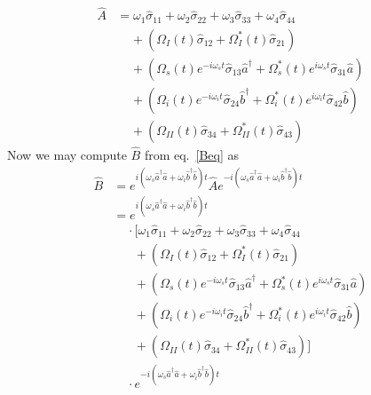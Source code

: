 \documentclass[aps,pra,showpacs,amsmath,amssymb,nofootinbib,longbibliography,superscriptaddress
]{revtex4-1}
\theoremstyle{definition}
\theoremstyle{remark}
\newcommand{\0}{\hat{0}}
\begin{document}
\begin{align}
    \hat{A}
    &=
    \omega_1 \hat{\sigma}_{11} + \omega_2 \hat{\sigma}_{22} + \omega_3 \hat{\sigma}_{33} + \omega_4 \hat{\sigma}_{44} \nonumber \\
    &\;\;\;\;+
    \left(
        \Omega_{I}(t) \hat{\sigma}_{12} +
        \Omega_{I}^*(t) \hat{\sigma}_{21}
    \right)\nonumber \\
    &\;\;\;\;+
    \left(
        \Omega_{s}(t) e^{-i \omega_s t} \hat{\sigma}_{13} \hat{a}^{\dagger} +
        \Omega_{s}^*(t) e^{i \omega_s t} \hat{\sigma}_{31} \hat{a}
    \right)\nonumber \\
    &\;\;\;\;+
    \left(
        \Omega_{i}(t) e^{-i\omega_i t} \hat{\sigma}_{24} \hat{b}^{\dagger} +
        \Omega_{i}^*(t) e^{i\omega_i t} \hat{\sigma}_{42} \hat{b}
    \right)\nonumber \\
    &\;\;\;\;+
    \left(
        \Omega_{II}(t) \hat{\sigma}_{34} +
        \Omega_{II}^*(t) \hat{\sigma}_{43}
    \right)
\end{align}
Now we may compute $\hat{B}$ from eq.~\eqref{Beq} as
\begin{align}
    \hat{B}
    &=
    e^{i(\omega_s \hat{a}^{\dagger} \hat{a} + \omega_i \hat{b}^{\dagger} \hat{b})t}
    \hat{A}
    e^{-i(\omega_s \hat{a}^{\dagger} \hat{a} + \omega_i \hat{b}^{\dagger} \hat{b})t} \nonumber \\
    &=
    e^{i(\omega_s \hat{a}^{\dagger} \hat{a} + \omega_i \hat{b}^{\dagger} \hat{b})t} \nonumber\\
    &\;\;\;\;
    \cdot \biggl[
        \omega_1 \hat{\sigma}_{11} +
        \omega_2 \hat{\sigma}_{22} +
        \omega_3 \hat{\sigma}_{33} +
        \omega_4 \hat{\sigma}_{44} \nonumber \\
        &\;\;\;\;\;\;+
        \left(
            \Omega_{I}(t) \hat{\sigma}_{12} +
            \Omega_{I}^*(t) \hat{\sigma}_{21}
        \right)\nonumber \\
        &\;\;\;\;\;\;+
        \left(
            \Omega_{s}(t) e^{-i \omega_s t} \hat{\sigma}_{13} \hat{a}^{\dagger} +
            \Omega_{s}^*(t) e^{i \omega_s t} \hat{\sigma}_{31} \hat{a}
        \right)\nonumber \\
        &\;\;\;\;\;\;+
        \left(
            \Omega_{i}(t) e^{-i\omega_i t} \hat{\sigma}_{24} \hat{b}^{\dagger} +
            \Omega_{i}^*(t) e^{i\omega_i t} \hat{\sigma}_{42} \hat{b}
        \right)\nonumber \\
        &\;\;\;\;\;\;+
        \left(
            \Omega_{II}(t) \hat{\sigma}_{34} +
            \Omega_{II}^*(t) \hat{\sigma}_{43}
        \right)
    \biggr] \nonumber\\
    &\;\;\;\;\cdot
    e^{-i(\omega_s \hat{a}^{\dagger} \hat{a} + \omega_i \hat{b}^{\dagger} \hat{b})t}
\end{align}
\end{document}
